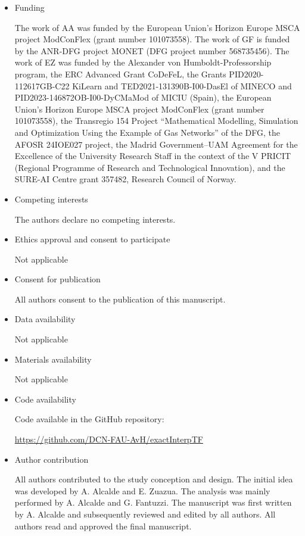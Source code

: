 \documentclass[pdflatex,sn-mathphys-num]{sn-jnl}%
\theoremstyle{thmstyleone}%
\theoremstyle{thmstyletwo}%
\theoremstyle{thmstylethree}%
\numberwithin{equation}{section}
\begin{document}
\begin{itemize}
\item Funding

The work of AA was funded by the European Union's Horizon Europe MSCA project ModConFlex (grant number 101073558). 
The work of GF is funded by the ANR-DFG project MONET (DFG project number 568735456).
The work of EZ was funded by the Alexander von Humboldt-Professorship program, the ERC Advanced Grant CoDeFeL, the Grants PID2020-112617GB-C22 KiLearn and TED2021-131390B-I00-DasEl of MINECO and PID2023-146872OB-I00-DyCMaMod of MICIU (Spain),  the European Union's Horizon Europe MSCA project ModConFlex (grant number 101073558), the Transregio 154 Project ``Mathematical Modelling, Simulation and Optimization Using the Example of Gas Networks'' of the DFG, the AFOSR 24IOE027 project, the Madrid Government--UAM Agreement for the Excellence of the University Research Staff in the context of the V PRICIT (Regional Programme of Research and Technological Innovation), and the SURE-AI Centre grant 357482, Research Council of Norway. 

\item Competing interests 

The authors declare no competing interests.

\item Ethics approval and consent to participate

Not applicable

\item Consent for publication

All authors consent to the publication of this manuscript.

\item Data availability 

Not applicable

\item Materials availability

Not applicable

\item Code availability 

Code available in the GitHub repository: 

\url{https://github.com/DCN-FAU-AvH/exactInterpTF}

\item Author contribution

All authors contributed to the study conception and design. The initial idea was developed by A. Alcalde and E. Zuazua. The analysis was mainly performed by A. Alcalde and G. Fantuzzi. The manuscript was first written by A. Alcalde and subsequently reviewed and edited by all authors. All authors read and approved the final manuscript.
\end{itemize}

\end{document}
